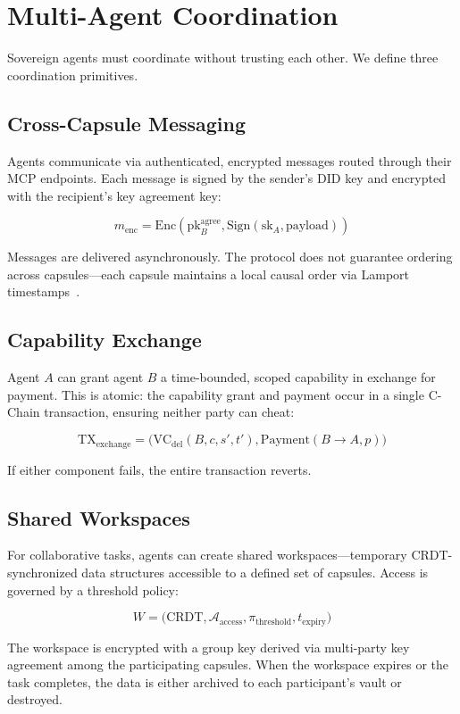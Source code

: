 \section{Multi-Agent Coordination}
\label{sec:coordination}

Sovereign agents must coordinate without trusting each other. We define three coordination primitives.

\subsection{Cross-Capsule Messaging}

Agents communicate via authenticated, encrypted messages routed through their MCP endpoints. Each message is signed by the sender's DID key and encrypted with the recipient's key agreement key:

\begin{equation}\label{eq:message}
    m_{\text{enc}} = \text{Enc}(\text{pk}_B^{\text{agree}}, \text{Sign}(\text{sk}_A, \text{payload}))
\end{equation}

Messages are delivered asynchronously. The protocol does not guarantee ordering across capsules---each capsule maintains a local causal order via Lamport timestamps~\cite{lamport1978clocks}.

\subsection{Capability Exchange}

Agent $A$ can grant agent $B$ a time-bounded, scoped capability in exchange for payment. This is atomic: the capability grant and payment occur in a single C-Chain transaction, ensuring neither party can cheat:

\begin{equation}\label{eq:exchange}
    \text{TX}_{\text{exchange}} = \big(\text{VC}_{\text{del}}(B, c, s', t'), \text{Payment}(B \to A, p)\big)
\end{equation}

If either component fails, the entire transaction reverts.

\subsection{Shared Workspaces}

For collaborative tasks, agents can create shared workspaces---temporary CRDT-synchronized data structures accessible to a defined set of capsules. Access is governed by a threshold policy:

\begin{equation}\label{eq:workspace}
    W = \big(\text{CRDT}, \mathcal{A}_{\text{access}}, \pi_{\text{threshold}}, t_{\text{expiry}}\big)
\end{equation}

The workspace is encrypted with a group key derived via multi-party key agreement among the participating capsules. When the workspace expires or the task completes, the data is either archived to each participant's vault or destroyed.

